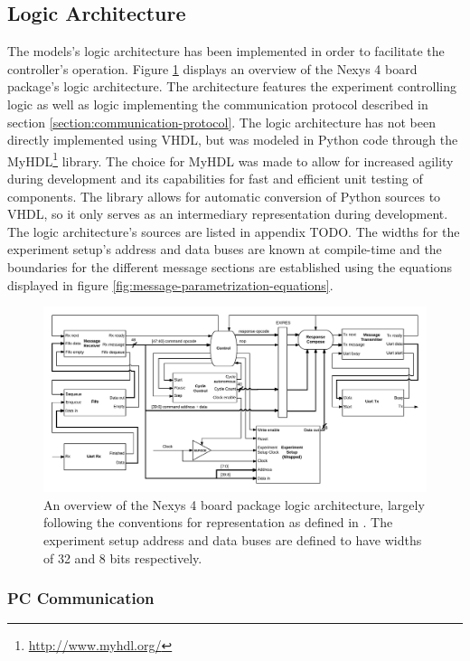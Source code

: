 \documentclass[main.tex]{subfiles}
\begin{document}
\subsection{Logic Architecture}
The models's logic architecture has been implemented in order to facilitate the controller's operation. Figure \ref{fig:board-package-architecture} displays an overview of the Nexys 4 board package's logic architecture. The architecture features the experiment controlling logic as well as logic implementing the communication protocol described in section \ref{section:communication-protocol}. The logic architecture has not been directly implemented using VHDL, but was modeled in Python code through the MyHDL\footnote{\url{http://www.myhdl.org/}} library. The choice for MyHDL was made to allow for increased agility during development and its capabilities for fast and efficient unit testing of components. The library allows for automatic conversion of Python sources to VHDL, so it only serves as an intermediary representation during development. The logic architecture's sources are listed in appendix TODO. The widths for the experiment setup's address and data buses are known at compile-time and the boundaries for the different message sections are established using the equations displayed in figure \ref{fig:message-parametrization-equations}.

\begin{figure}[h]
\centering
\caption{An overview of the Nexys 4 board package logic architecture, largely following the conventions for representation as defined in \cite[Ch.4]{hennessy2013computer}. The experiment setup address and data buses are defined to have widths of 32 and 8 bits respectively.}
\label{fig:board-package-architecture}
\includegraphics[width=\textwidth]{img/controller-architecture}
\end{figure}

\subsubsection{PC Communication}
\end{document}
